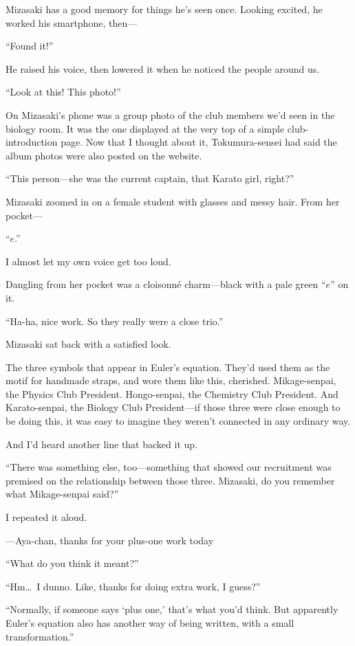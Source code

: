 \documentclass[
    a4paper,
    12pt,
    twoside,
    openany,
    UTF8,
    fontset=windows
]{ctexbook}
\begin{document}
Mizasaki has a good memory for things he's seen once. Looking excited, he worked his smartphone, then---

``Found it!''

He raised his voice, then lowered it when he noticed the people around us.

``Look at this! This photo!''

On Mizasaki's phone was a group photo of the club members we'd seen in the biology room. It was the one displayed at the very top of a simple club-introduction page. Now that I thought about it, Tokumura-sensei had said the album photos were also posted on the website.

``This person---she was the current captain, that Karato girl, right?''

Mizasaki zoomed in on a female student with glasses and messy hair. From her pocket---

``$e$.''

I almost let my own voice get too loud.

Dangling from her pocket was a cloisonné charm---black with a pale green ``$e$'' on it.

``Ha-ha, nice work. So they really were a close trio.''

Mizasaki sat back with a satisfied look.

The three symbols that appear in Euler's equation. They'd used them as the motif for handmade straps, and wore them like this, cherished. Mikage-senpai, the Physics Club President. Hongo-senpai, the Chemistry Club President. And Karato-senpai, the Biology Club President---if those three were close enough to be doing this, it was easy to imagine they weren't connected in any ordinary way.

And I'd heard another line that backed it up.

``There was something else, too---something that showed our recruitment was premised on the relationship between those three. Mizasaki, do you remember what Mikage-senpai said?''

I repeated it aloud.

---Aya-chan, thanks for your plus-one work today

``What do you think it meant?''

``Hm\dots\ I dunno. Like, thanks for doing extra work, I guess?''

``Normally, if someone says `plus one,' that's what you'd think. But apparently Euler's equation also has another way of being written, with a small transformation.''
\end{document}
